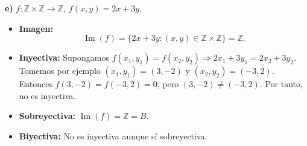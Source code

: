 \documentclass[a4paper,12pt]{article}
\begin{document}
\begin{ejercicio}[title=Ejercicio 19]
\textbf{e) } $f:\mathbb{Z}\times\mathbb{Z}\to\mathbb{Z},\ f(x,y)=2x+3y$.

\begin{itemize}
  \item \textbf{Imagen:} 
  \[
    \operatorname{Im}(f) = \{ 2x+3y : (x,y) \in \mathbb{Z}\times\mathbb{Z} \} = \boxed{\mathbb{Z}}.
  \]
  \item \textbf{Inyectiva:} Supongamos $f(x_1,y_1) = f(x_2,y_2) \Rightarrow 2x_1 + 3y_1 = 2x_2 + 3y_2$.  
  Tomemos por ejemplo $(x_1,y_1) = (3,-2)$ y $(x_2,y_2) = (-3,2)$. Entonces $f(3,-2) = f(-3,2) = 0$, pero $(3,-2) \neq (-3,2)$. Por tanto, no es inyectiva. 
  \item \textbf{Sobreyectiva:} $\operatorname{Im}(f) = \mathbb{Z} = B$. 
  \item \textbf{Biyectiva:} No es inyectiva aunque sí sobreyectiva. 
\end{itemize}

\end{ejercicio}
\end{document}
